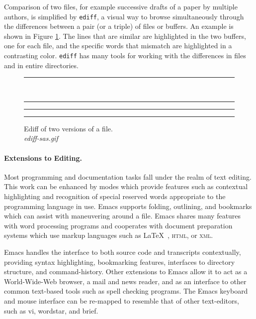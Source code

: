 \documentclass{article}
\newcommand{\stexttt}[1]{{\small\texttt{#1}}}
\newcommand{\emptyfig}{
\hspace*{42pt}\rule{324pt}{.25pt}\\
\hspace*{42pt}\rule{.25pt}{10pc}
\rule{316pt}{.25pt}
\rule{.25pt}{10pc}}
\begin{document}
Comparison of two files, for example successive drafts of a paper
by multiple authors, is simplified by \stexttt{ediff}, a visual 
way to browse simultaneously through
the differences between a pair (or a triple) of files or buffers.
An example is shown in Figure \ref{f.ediff}.  The lines that are similar
are highlighted in the two buffers, one for each file, and the specific
words that mismatch are highlighted in a contrasting color.
\stexttt{ediff} has many tools for working with the differences in
files and in entire directories.

\begin{figure}
\emptyfig
\caption[place holder for a long caption]{Ediff of two versions of a file.\\
{\it ediff-sas.gif}
\label{f.ediff}}
\end{figure}





\paragraph{Extensions to Editing.}
Most programming and documentation tasks fall under the realm of text
editing.  This work can be enhanced by modes which provide features
such as contextual highlighting and recognition of special reserved
words appropriate to the programming language in use.  Emacs supports
folding, outlining, and bookmarks which can assist with maneuvering
around a file.  Emacs shares many features with word processing
programs and cooperates with document preparation systems which use
markup languages such as \LaTeX\ , \textsc{html}, or \textsc{xml}.


Emacs handles the interface to both source code and transcripts
contextually, providing syntax highlighting, bookmarking features,
interfaces to directory structure, and command-history.  Other
extensions to Emacs allow it to act as a World-Wide-Web browser, a
mail and news reader, and as an interface to other common text-based
tools such as spell checking programs.  The Emacs keyboard and mouse
interface can be re-mapped to resemble that of other text-editors,
such as vi, wordstar, and brief.
\end{document}
